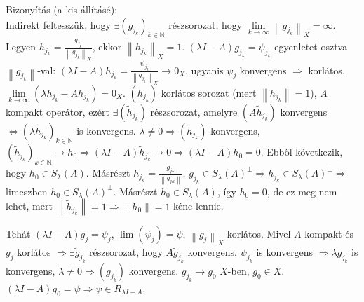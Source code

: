 \documentclass[12pt,a4paper]{scrartcl}
\newenvironment{bizonyitas}{}{}
\begin{document}
\begin{bizonyitas}
\begin{bizonyitas}
Bizonyítás (a kis állításé):\\
Indirekt feltesszük, hogy
\(\exists\left( g_{j_{k}} \right)_{k \in {\mathbb{N}}}\) részsorozat,
hogy
\(\lim\limits_{k\rightarrow\infty}\left\| g_{j_{k}} \right\|_{X} = \infty\).
Legyen \(h_{j_{k}} = \frac{g_{j_{k}}}{\left\| g_{j_{k}} \right\|_{X}}\),
ekkor \(\left\| h_{j_{k}} \right\|_{X} = 1\).
\(\left( {\lambda I - A} \right)g_{j_{k}} = \psi_{j_{k}}\) egyenletet
osztva \(\left\| g_{j_{k}} \right\|\)-val:
\(\left. \left( {\lambda I - A} \right)h_{j_{k}} = \frac{\psi_{j_{k}}}{\left\| g_{j_{k}} \right\|_{X}}\rightarrow 0_{X} \right.\),
ugyanis \(\psi_{j}\) konvergens \(\Rightarrow\) korlátos.
\(\lim\limits_{k\rightarrow\infty}\left( {\lambda h_{j_{k}} - Ah_{j_{k}}} \right) = 0_{X}\).
\(\left( h_{j_{k}} \right)\) korlátos sorozat (mert
\(\left\| h_{j_{k}} \right\| = 1\)), \(A\) kompakt operátor, ezért
\(\exists\left( {\widetilde{h}}_{j_{k}} \right)\) részsorozat, amelyre
\(\left( {A{\widetilde{h}}_{j_{k}}} \right)\) konvergens
\(\left. \Leftrightarrow\left( {\lambda{\widetilde{h}}_{j_{k}}} \right)_{k \in {\mathbb{N}}} \right.\)
is konvergens.
\(\left. \lambda \neq 0\Rightarrow\left( {\widetilde{h}}_{j_{k}} \right) \right.\)
konvergens,
\(\left. \left( {\widetilde{h}}_{j_{k}} \right)_{k \in {\mathbb{N}}}\rightarrow h_{0}\Rightarrow\left( {\lambda I - A} \right){\widetilde{h}}_{j_{k}}\rightarrow 0\Rightarrow\left( {\lambda I - A} \right)h_{0} = 0 \right.\).
Ebből következik, hogy \(h_{0} \in S_{\lambda}\left( A \right)\).
Másrészt \(h_{j_{k}} = \frac{g_{jk}}{\left\| g_{jk} \right\|}\),
\(\left. g_{j_{k}} \in S_{\lambda}\left( A \right)^{\bot}\Rightarrow h_{j_{k}} \in S_{\lambda}\left( A \right)^{\bot}\Rightarrow \right.\)
limeszben \(h_{0} \in S_{\lambda}\left( A \right)^{\bot}\). Másrészt
\(h_{0} \in S_{\lambda}\left( A \right)\), így \(h_{0} = 0\), de ez meg
nem lehet, mert
\(\left. \left\| {\widetilde{h}}_{j_{k}} \right\| = 1\Rightarrow\left\| h_{0} \right\| = 1 \right.\)
kéne lennie.

\end{bizonyitas}

Tehát \(\left( {\lambda I - A} \right)g_{j} = \psi_{j}\),
\(\lim\left( \psi_{j} \right) = \psi\), \(\left\| g_{j} \right\|_{X}\)
korlátos. Mivel \(A\) kompakt és \(g_{j}\) korlátos
\(\left. \Rightarrow\exists{\widetilde{g}}_{j_{k}} \right.\)
részsorozat, hogy \(A{\widetilde{g}}_{j_{k}}\) konvergens.
\(\psi_{j_{k}}\) is konvergens
\(\left. \Rightarrow\lambda g_{j_{k}} \right.\) is konvergens,
\(\left. \lambda \neq 0\Rightarrow\left( g_{j_{k}} \right) \right.\)
konvergens. \(\left. g_{j_{k}}\rightarrow g_{0} \right.\) \(X\)-ben,
\(g_{0} \in X\).
\(\left. \left( {\lambda I - A} \right)g_{0} = \psi\Rightarrow\psi \in R_{\lambda I - A} \right.\).

\end{bizonyitas}
\end{document}
